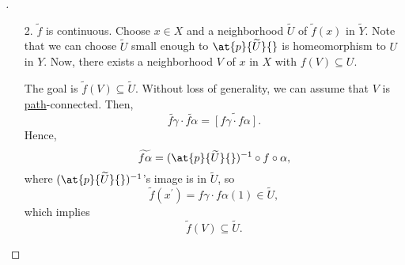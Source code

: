 \begin{proof}[\unskip\nopunct]
	\begin{enumerate}
		\item[2.] \(\widetilde{f} \) is continuous. Choose \(x\in X\) and a neighborhood \(\widetilde{U} \) of
			\(\widetilde{f} (x)\) in \(\widetilde{Y} \). Note that we can choose \(\widetilde{U} \) small enough to \(\at{p}{\widetilde{U} }{} \) is homeomorphism
			to \(U\) in \(Y\). Now, there exists a neighborhood \(V\) of \(x\) in \(X\) with \(f(V)\subseteq U\).
			\begin{figure}[H]
				\centering
				\label{fig:pf:prop:lifting-criterion-2}
			\end{figure}
			The goal is \(\widetilde{f} (V)\subseteq \widetilde{U}\). Without loss of generality, we can assume that
			\(V\) is \hyperref[def:path]{path}-connected. Then,
			\[
				\widetilde{f \gamma } \cdot \widetilde{f \alpha } = \widetilde{\left[f \gamma \cdot f \alpha \right]}.
			\]
			Hence,
			\[
				\widetilde{f \alpha } = (\at{p}{\widetilde{U} }{})^{-1} \circ f\circ \alpha,
			\]
			where \((\at{p}{\widetilde{U} }{})^{-1}\)'s image is in \(\widetilde{U} \), so
			\[
				\widetilde{f} (x ^\prime ) = f \gamma \cdot f \alpha (1)\in \widetilde{U},
			\]
			which implies
			\[
				\widetilde{f} (V)\subseteq \widetilde{U}.
			\]
	\end{enumerate}
\end{proof}

